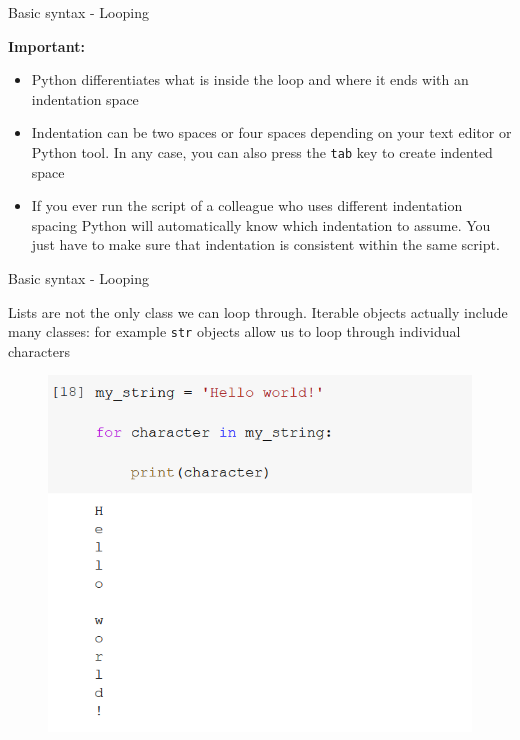 \documentclass[aspectratio=169]{beamer}
\begin{document}
\begin{frame}{Basic syntax - Looping}

	\textbf{Important:}

	\begin{itemize}	
		\item Python differentiates what is inside the  loop and where it ends with an indentation space
		\item Indentation can be two spaces or four spaces depending on your text editor or Python tool. In any case, you can also press the \texttt{tab} key to create indented space
		\item If you ever run the script of a colleague who uses different indentation spacing Python will automatically know which indentation to assume. You just have to make sure that indentation is consistent within the same script.
	\end{itemize}

\end{frame}

\begin{frame}{Basic syntax - Looping}

	Lists are not the only class we can loop through. Iterable objects actually include many classes: for example \texttt{str} objects allow us to loop through individual characters

	\begin{figure}
		\centering
		\includegraphics[width=0.55\linewidth]{img/string_loop.png}
	\end{figure}

\end{frame}
\end{document}
